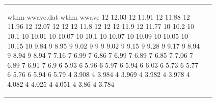 \begin{figure}[htbp]
    \centering
    \begin{tabular}{ll}
        \begin{filecontents*}{wthm-wwave.dat}
            wthm    wwave
            12  12.03
            12	11.91
            12	11.88
            12	11.96
            12	12.07
            12	12
            12	11.8
            12	12
            12	11.9
            12	11.77
            10	10.2
            10	10.1
            10	10.01
            10	10.07
            10	10.1
            10	10.07
            10	10.09
            10	10.05
            10	10.15
            10	9.84
            9	8.95
            9	9.02
            9	9
            9	9.02
            9	9.15
            9	9.28
            9	9.17
            9	8.94
            9	8.94
            9	8.94
            7	7.16
            7	6.99
            7	6.86
            7	6.99
            7	6.89
            7	6.85
            7	7.06
            7	6.89
            7	6.91
            7	6.9
            6	5.93
            6	5.96
            6	5.97
            6	5.94
            6	6.03
            6	5.73
            6	5.77
            6	5.76
            6	5.94
            6	5.79
            4	3.908
            4	3.984
            4	3.969
            4	3.982
            4	3.978
            4	4.082
            4	4.025
            4	4.051
            4	3.86
            4	3.784            
        \end{filecontents*}
    

\end{tabular}
\end{figure}
